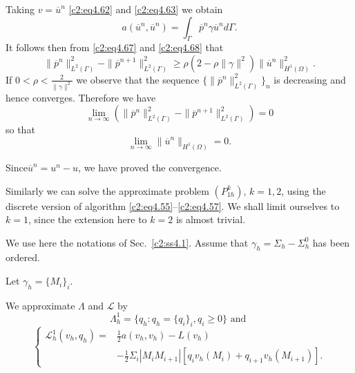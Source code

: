 Taking $v = \overline{u}^n$ \eqref{c2:eq4.62} and \eqref{c2:eq4.63} we obtain 
\begin{equation}
a(\overline{u}^n, \overline{u}^n) = \int_\Gamma \overline{p}^n \gamma
\overline{u}^n d \Gamma. \tag{4.68}\label{c2:eq4.68} 
\end{equation}
It follows then from \eqref{c2:eq4.67} and \eqref{c2:eq4.68} that  
\begin{equation}
\parallel \overline{p}^n\parallel^2_{L^2(\Gamma)} -
\parallel \overline{p}^{n+1}\parallel^2_{L^2(\Gamma)} \geq \rho (2-\rho \parallel \gamma\parallel^2
) \parallel \overline{u}^n\parallel^2_{H^1(\Omega)}.\tag{4.69}\label{c2:eq4.69} 
\end{equation}
If $0 < \rho < \frac{2}{\parallel \gamma\parallel^2}$ we observe that the sequence
$\{\parallel \overline{p}^n\parallel^2_{L^2 (\Gamma)}\}_n$ is decreasing and hence
converges. Therefore we have  
$$
\lim_{n \to \infty}(\parallel \overline{p}^n\parallel^2_{L^2(\Gamma)} -
\parallel \overline{p}^{n+1}\parallel^2 _{L^2(\Gamma)}) = 0  
$$
so that 
$$
\lim_{n \to \infty}\parallel \overline{u}^n\parallel_{H^1(\Omega)} = 0. 
$$

Since\pageoriginale  $\overline{u}^n = u^n - u$, we have proved the convergence.  

Similarly  we can solve the approximate problem $(P^k_{1h})$, $k = 1,
2$,  using the discrete version of algorithm
\eqref{c2:eq4.55}--\eqref{c2:eq4.57}. 
We shall limit ourselves to $k=1$, since the extension here to $k=2$
is almost trivial. 

We use here the notations of Sec.~\ref{c2:ss4.1}. Assume that $\gamma_h =
\Sigma_h - \Sigma^0_h$ has been ordered. 

Let  $\gamma_h = \{M_i\}_i$.

We approximate $\Lambda $ and $\mathscr{L}$ by
$$
\Lambda^1_h = \{q_h : q_h = \{q_i\}_i, q_i \geq 0\} \text{ and } 
$$
\begin{equation}
\begin{cases}
\mathscr{L}^1_h (v_h, q_h) = & \frac {1}{2} a (v_h, v_h) -L (v_h)\\
&-\frac{1}{2} \Sigma_i |M_i M_{i+1} | [q_i v_h (M_i) + q_{i+1} v_h
  (M_{i+1})]. 
\end{cases}
\end{equation}

